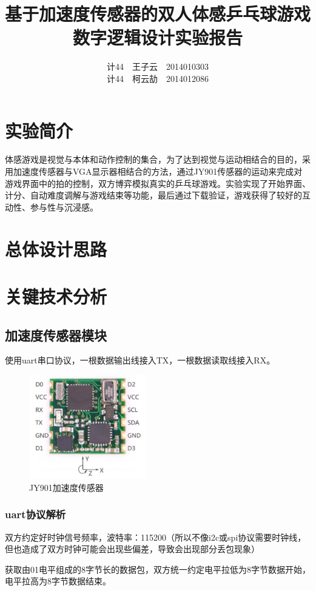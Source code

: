 \documentclass[UTF8]{article}
\title{基于加速度传感器的双人体感乒乓球游戏\\
数字逻辑设计实验报告}
\author{计44~~王子云~~2014010303\\
计44~~柯云劼~~2014012086
}
\date{ }
\begin{document}
\maketitle
\newpage
\tableofcontents 
\newpage
\section{实验简介}
体感游戏是视觉与本体和动作控制的集合，为了达到视觉与运动相结合的目的，采用加速度传感器与VGA显示器相结合的方法，通过JY901传感器的运动来完成对游戏界面中的拍的控制，双方博弈模拟真实的乒乓球游戏。实验实现了开始界面、计分、自动难度调解与游戏结束等功能，最后通过下载验证，游戏获得了较好的互动性、参与性与沉浸感。
\section{总体设计思路}

\section{关键技术分析}
\subsection{加速度传感器模块}
使用uart串口协议，一根数据输出线接入TX，一根数据读取线接入RX。
	\begin{figure}[H]
		\centering
		\includegraphics[width=2in]{2-1.png}
			\caption{JY901加速度传感器}	
	\end{figure}
\subsubsection{uart协议解析}
双方约定好时钟信号频率，波特率：115200（所以不像i2c或spi协议需要时钟线，但也造成了双方时钟可能会出现些偏差，导致会出现部分丢包现象）\par
获取由01电平组成的8字节长的数据包，双方统一约定电平拉低为8字节数据开始，电平拉高为8字节数据结束。\par
\end{document}
